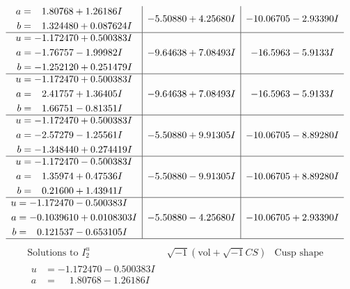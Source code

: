 \documentclass[1p]{elsarticle_modified}
\theoremstyle{definition}
\newcommand{\I}{\sqrt{-1}}
\begin{document}
$$\begin{array}{c|c|c}
\begin{aligned}
a &= \phantom{-}1.80768 + 1.26186 I \\
b &= \phantom{-}1.324480 + 0.087624 I\end{aligned}
 & -5.50880 + 4.25680 I & -10.06705 - 2.93390 I \\ \hline\begin{aligned}
u &= -1.172470 + 0.500383 I \\
a &= -1.76757 - 1.99982 I \\
b &= -1.252120 + 0.251479 I\end{aligned}
 & -9.64638 + 7.08493 I & -16.5963 - 5.9133 I \\ \hline\begin{aligned}
u &= -1.172470 + 0.500383 I \\
a &= \phantom{-}2.41757 + 1.36405 I \\
b &= \phantom{-}1.66751 - 0.81351 I\end{aligned}
 & -9.64638 + 7.08493 I & -16.5963 - 5.9133 I \\ \hline\begin{aligned}
u &= -1.172470 + 0.500383 I \\
a &= -2.57279 - 1.25561 I \\
b &= -1.348440 + 0.274419 I\end{aligned}
 & -5.50880 + 9.91305 I & -10.06705 - 8.89280 I \\ \hline\begin{aligned}
u &= -1.172470 - 0.500383 I \\
a &= \phantom{-}1.35974 + 0.47536 I \\
b &= \phantom{-}0.21600 + 1.43941 I\end{aligned}
 & -5.50880 - 9.91305 I & -10.06705 + 8.89280 I \\ \hline\begin{aligned}
u &= -1.172470 - 0.500383 I \\
a &= -0.1039610 + 0.0108303 I \\
b &= \phantom{-}0.121537 - 0.653105 I\end{aligned}
 & -5.50880 - 4.25680 I & -10.06705 + 2.93390 I\\
 \hline 
 \end{array}$$\newpage$$\begin{array}{c|c|c}  
\text{Solutions to }I^u_{2}& \I (\text{vol} + \sqrt{-1}CS) & \text{Cusp shape}\\
 \hline 
\begin{aligned}
u &= -1.172470 - 0.500383 I \\
a &= \phantom{-}1.80768 - 1.26186 I \\

\end{aligned}
\end{array}$$
\end{document}
